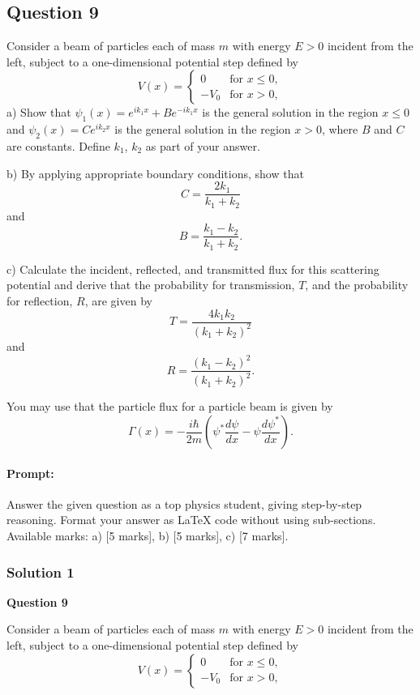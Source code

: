\documentclass{article}
\begin{document}
\subsection{Question 9}
Consider a beam of particles each of mass $m$ with energy $E > 0$ incident from the left, subject to a one-dimensional potential step defined by
\[
V(x) =
\begin{cases}
0 & \text{for } x \leq 0, \\
-V_0 & \text{for } x > 0,
\end{cases}
\]
a) Show that $\psi_1(x) = e^{ik_1x} + Be^{-ik_1x}$ is the general solution in the region $x \leq 0$ and $\psi_2(x) = Ce^{ik_2x}$ is the general solution in the region $x > 0$, where $B$ and $C$ are constants. Define $k_1$, $k_2$ as part of your answer.

b) By applying appropriate boundary conditions, show that
\[
C = \frac{2k_1}{k_1 + k_2}
\]
and
\[
B = \frac{k_1 - k_2}{k_1 + k_2}.
\]

c) Calculate the incident, reflected, and transmitted flux for this scattering potential and derive that the probability for transmission, $T$, and the probability for reflection, $R$, are given by
\[
T = \frac{4k_1k_2}{(k_1 + k_2)^2}
\]
and
\[
R = \frac{(k_1 - k_2)^2}{(k_1 + k_2)^2}.
\]

You may use that the particle flux for a particle beam is given by
\[
\Gamma(x) = -\frac{i\hbar}{2m} \left( \psi^* \frac{d\psi}{dx} - \psi \frac{d\psi^*}{dx} \right).
\]


\paragraph{Prompt: \\} 
Answer the given question as a top physics student, giving step-by-step reasoning. Format your answer as LaTeX code without using sub-sections. Available marks: a) [5 marks], b) [5 marks], c) [7 marks].


\subsubsection{Solution 1}
\textbf{Question 9}

Consider a beam of particles each of mass  $m$ with energy $E>0$ incident from the left, subject to a one-dimensional potential step defined by
\[
V(x) =
\begin{cases}
0 & \text{for } x \leq 0, \\
-V_0 & \text{for } x > 0,
\end{cases}
\]
\end{document}
